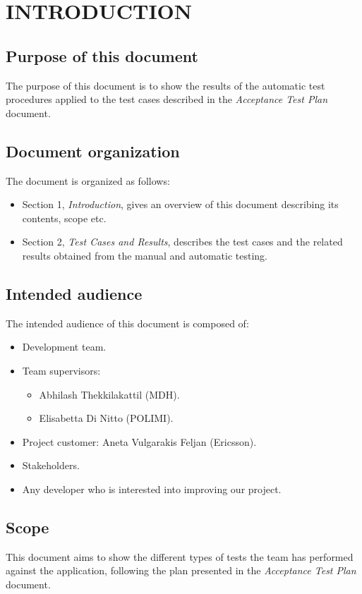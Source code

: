 \section{INTRODUCTION}

\subsection{Purpose of this document}
The purpose of this document is to show the results of the automatic test procedures applied to the test cases described in the \textit{Acceptance Test Plan} document. 

\subsection{Document organization}
The document is organized as follows:
\begin{itemize}
	\item Section 1, \textit{Introduction}, gives an overview of this document describing its contents, scope etc.
	\item Section 2, \textit{Test Cases and Results}, describes the test cases and the related results obtained from the manual and automatic testing.
\end{itemize}

\subsection{Intended audience}
The intended audience of this document is composed of:
\begin{itemize}
	\item Development team.
	\item Team supervisors:
	\begin{itemize}
		\item Abhilash Thekkilakattil (MDH).
		\item Elisabetta Di Nitto (POLIMI).
	\end{itemize}
	\item Project customer: Aneta Vulgarakis Feljan (Ericsson).
	\item Stakeholders.
	\item Any developer who is interested into improving our project.
\end{itemize}

\subsection{Scope}
This document aims to show the different types of tests the team has performed against the application, following the plan presented in the \textit{Acceptance Test Plan} document.

